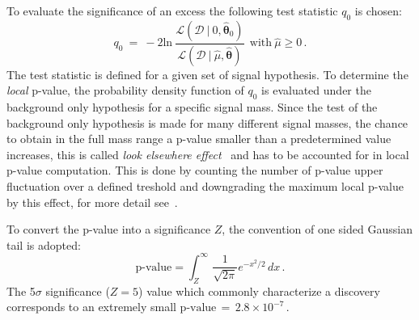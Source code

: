 To evaluate the significance of an excess the following  test statistic $q_0$ is chosen:
\begin{equation}
q_0 ~ = ~  -2 \text{ln} ~ \frac{\mathcal{L}(\mathcal{D}~|~0, \hat{\boldsymbol{\theta}}_{0})}{\mathcal{L}(\mathcal{D} ~| ~ \hat{\mu}, \hat{\boldsymbol{\theta}})}
 ~ ~ \text{with} ~  \hat{\mu} \ge 0\,.
\end{equation}
The test statistic is defined for a given set of signal hypothesis. To determine the \emph{local} p-value,
the probability density function of $q_0$ is evaluated under the background only hypothesis for a specific signal mass.  
Since the test of the background only hypothesis is made for many different signal masses, the chance to obtain in the full
mass range a p-value smaller than a predetermined value increases, this is called \emph{look elsewhere effect}~\cite{LEE}
and has to be accounted for in local p-value computation. This is done by counting the number of p-value upper fluctuation over
a defined treshold and downgrading the maximum local p-value by this effect, for more detail see~\cite{lhclimits,LEE}.

To convert the p-value into a significance $Z$, the convention of one sided Gaussian tail is adopted:
\begin{equation}
\text{p-value} = \int_Z^\infty \, \frac{1}{\sqrt{2\pi}} e^{-x^2/2} \, dx \,.
\end{equation}
The 5$\sigma$ significance ($Z = 5$) value which  commonly characterize a discovery corresponds to an 
extremely  small $\text{p-value}\,=\, 2.8 \times 10^{-7}\,.$




